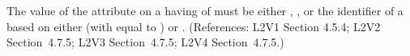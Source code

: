The value of the  attribute on a \Compartment having
 of  must be either ,
, or the identifier of a \UnitDefinition based on
either  (with  equal to ) or
.  (References: L2V1 Section 4.5.4; L2V2
Section~4.7.5; L2V3 Section~4.7.5; L2V4 Section~4.7.5.)
